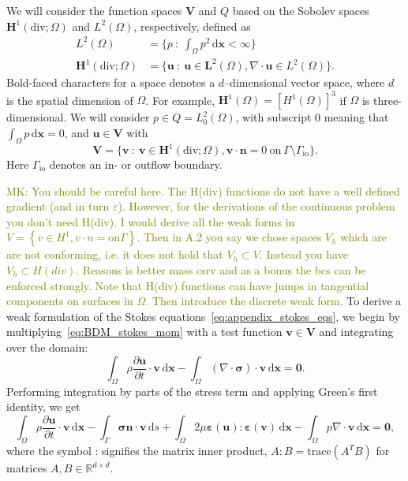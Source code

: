 \documentclass[fleqn]{wlscirep}
\newcommand{\pdifft}[1]{\frac{\partial  #1}{\partial t}}
\newcommand{\intO}[1]{\int_{\Omega}#1 \, \mathrm d\bm{x}}
\newcommand{\intG}[1]{\int_{\Gamma}#1 \, \mathrm ds}
\newcommand{\nn}{\mathbf{n}}
\newcommand{\uu}{\mathbf{u}}
\newcommand{\vv}{\mathbf{v}}
\newcommand{\VV}{\mathbf{V}}
\newcommand{\bsig}{\bm{\sigma}}
\newcommand{\beps}{\bm{\varepsilon}}
\newcommand{\mk}[1]{\textcolor{olive}{MK: #1}}
\begin{document}
We will consider the function spaces $\VV$ and $Q$ based on the Sobolev spaces $\mathbf{H}^1(\mathrm{div}; \Omega)$ and $L^2(\Omega)$, respectively, defined as 
\begin{align*}
    L^2(\Omega) &= \bigg\{p \ : \ \intO{p^2} < \infty\bigg\} \\
    \mathbf{H}^1(\mathrm{div}; \Omega) &= \bigg\{\uu \ : \ \uu\in\mathbf{L}^2(\Omega), \nabla\cdot\uu\in L^2(\Omega)\bigg\}.
\end{align*}
Bold-faced characters for a space denotes a $d$--dimensional vector space, where $d$ is the spatial dimension of $\Omega$. For example, $\mathbf{H}^1(\Omega) = [H^1(\Omega)]^3$ if $\Omega$ is three-dimensional. We will consider $p\in Q=L^2_0(\Omega)$, with subscript 0 meaning that $\intO{p} = 0$, and $\uu\in\VV$ with
\begin{equation*}
    \VV =  \bigg\{\vv \ : \ \vv\in\mathbf{H}^1(\mathrm{div}; \Omega), \vv\cdot\nn=0 \ \mathrm{on} \ \Gamma\setminus\Gamma_{\mathrm{io}}\bigg\}.
\end{equation*}
Here $\Gamma_{\mathrm{io}}$ denotes an in- or outflow boundary. 

\mk{
You should be careful here. The H(div) functions do not have a well defined gradient (and in turn $\varepsilon$). However, for the derivations of the continuous problem you don't need H(div). I would derive all the weak forms in $V = \left\{ v\in H^1, v\cdot n = \text{on} \Gamma\right\}$. Then in A.2 you say we chose spaces $V_h$ which are are not conforming, i.e. it does not hold that $V_h\subset V$. Instead you have $V_h\subset H(div)$. Reasons is better mass csrv and as a bonus the bcs can be enforced strongly. Note that H(div) functions can have jumps in tangential components on surfaces in $\Omega$. Then introduce the discrete weak form.  
}
To derive a weak formulation of the Stokes equations~\eqref{eq:appendix_stokes_eqs}, we begin by multiplying~\eqref{eq:BDM_stokes_mom} with a test function $\vv\in\VV$ and integrating over the domain:
\begin{equation*}
    \intO{\rho\pdifft{\uu}\cdot\vv} - \intO{(\nabla\cdot\bsig)\cdot\vv} = \mathbf{0}.
\end{equation*}
Performing integration by parts of the stress term and applying Green's first identity, we get
\begin{equation}
    \intO{\rho\pdifft{\uu}\cdot\vv} - \intG{\bsig\nn\cdot\vv} + \intO{2\mu\beps(\uu) : \beps(\vv)} - \intO{p\nabla\cdot\vv} = \mathbf{0}, \label{eq:modelA_weak_form1}
\end{equation}
where the symbol : signifies the matrix inner product, $A:B=\text{trace}{(A^TB)}$ for matrices $A, B\in\mathbb{R}^{d\times d}$. 
\end{document}
